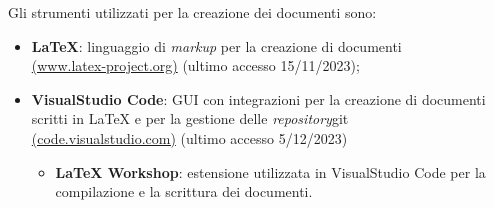 Gli strumenti utilizzati per la creazione dei documenti sono:
\begin{itemize}
	\item \textbf{LaTeX}: linguaggio di \textit{markup} per la creazione di documenti \\
	      \href{https://www.latex-project.org/}{(www.latex-project.org)} (ultimo accesso 15/11/2023);
	\item \textbf{VisualStudio Code}: GUI con integrazioni per la creazione di documenti scritti in LaTeX e per la gestione delle \textit{repository}\g git\g \\
	      \href{https://code.visualstudio.com/}{(code.visualstudio.com)} (ultimo accesso 5/12/2023)
	      \begin{itemize}
		      \item \textbf{LaTeX Workshop}: estensione utilizzata in VisualStudio Code per la compilazione e la scrittura dei documenti.
	      \end{itemize}
\end{itemize}
